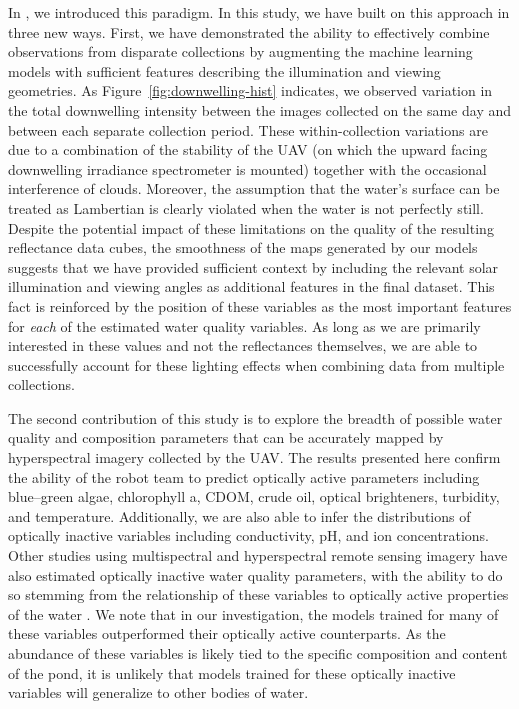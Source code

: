 In \cite{robot-team-1}, we introduced this paradigm. In this study, we have built on this approach in three new ways. First, we have demonstrated the ability to effectively combine observations from disparate collections by augmenting the machine learning models with sufficient features describing the illumination and viewing geometries. As Figure~\ref{fig:downwelling-hist} indicates, we observed variation in the total downwelling intensity between the images collected on the same day and between each separate collection period. These within-collection variations are due to a combination of the stability of the UAV (on which the upward facing downwelling irradiance spectrometer is mounted) together with the occasional interference of clouds. Moreover, the assumption that the water's surface can be treated as Lambertian is clearly violated when the water is not perfectly still. Despite the potential impact of these limitations on the quality of the resulting reflectance data cubes, the smoothness of the maps generated by our models suggests that we have provided sufficient context by including the relevant solar illumination and viewing angles as additional features in the final dataset.  This fact is reinforced by the position of these variables as the most important features for \textit{each} of the estimated water quality variables. As long as we are primarily interested in these values and not the reflectances themselves, we are able to successfully account for these lighting effects when combining data from multiple collections.

The second contribution of this study is to explore the breadth of possible
water quality and composition parameters that can be accurately mapped by
hyperspectral imagery collected by the UAV. The results presented here confirm
the ability of the robot team to predict optically active parameters including
blue--green algae, chlorophyll a, CDOM, crude oil, optical brighteners, turbidity, and temperature. Additionally, we are also able to infer the distributions of optically inactive variables including conductivity, pH, and ion concentrations. Other studies using multispectral and hyperspectral remote sensing imagery have also estimated optically inactive water quality parameters, with the ability to do so stemming from the relationship of these variables to optically active properties of the water \cite{vakili2020determination,guo2021machine,niu2021deep}. We note that in our investigation, the models trained for many of these variables outperformed their optically active counterparts. As the abundance of these variables is likely tied to the specific composition and content of the pond, it is unlikely that models trained for these optically inactive variables will generalize to other bodies of water. 

